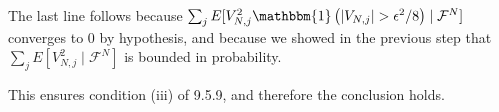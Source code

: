 \documentclass{article}
\begin{document}
The last line follows because $\sum_j E[ V_{N,j}^2 \mathbbm{1} \left(|V_{N,j}| > \epsilon^2/8 \right) \mid \mathcal{F}^N]$ converges to $0$ by hypothesis, and because we showed in the previous step that $\sum_j E[ V_{N,j}^2 \mid \mathcal{F}^N]$ is bounded in probability.

This ensures condition (iii) of 9.5.9, and therefore the conclusion holds.
\end{document}
